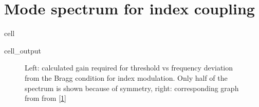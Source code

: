 \documentclass[a4paper,10pt,english,openany,oneside]{jupyterBook}
\begin{document}
\section{Mode spectrum for index coupling}
\label{\detokenize{Kogelnik-Shank_Coupled-Wave-Theory_DFB-Lasers:mode-spectrum-for-index-coupling}}
\begin{sphinxuseclass}{cell}\begin{sphinxVerbatimOutput}

\begin{sphinxuseclass}{cell_output}
\begin{figure}[htbp]
\centering
\capstart

\noindent{}
\caption{Left: calculated gain required for threshold vs frequency deviation from the Bragg condition for index modulation.  Only half of the spectrum is shown because of symmetry, right: corresponding graph from from {[}\hyperlink{cite.bib:id3}{1}{]}}\label{\detokenize{Kogelnik-Shank_Coupled-Wave-Theory_DFB-Lasers:kogelnik5c}}\end{figure}

\end{sphinxuseclass}\end{sphinxVerbatimOutput}

\end{sphinxuseclass}
\end{document}
